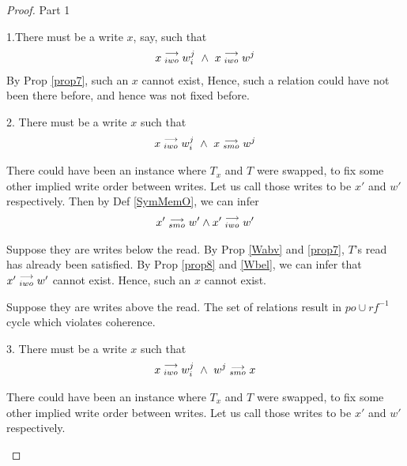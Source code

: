 \begin{proof}{Part 1}
\begin{itemize}
                        1.There must be a write $x$, say, such that 
                        \begin{align*}
                            \reln{x}{iwo}{w_i^j} \ \wedge \ \reln{x}{iwo}{w^j}
                        \end{align*}
                        By Prop \ref{prop7}, such an $x$ cannot exist, Hence, such a relation could have not been there before, and hence was not fixed before.

                        2. There must be a write $x$ such that 
                        \begin{align*}
                            \reln{x}{iwo}{w_i^j} \ \wedge \ \reln{x}{smo}{w^j}
                        \end{align*}

                        There could have been an instance where $T_x$ and $T$ were swapped, to fix some other implied write order between writes. 
                        Let us call those writes to be $x'$ and $w'$ respectively.
                        Then by Def \ref{SymMemO}, we can infer 
                        \begin{align*}
                            x'\stackrel{\longrightarrow}{_{smo}}w' \wedge x'\stackrel{\longrightarrow}{_{iwo}}w'
                        \end{align*}
                        
                        Suppose they are writes below the read.                         
                        By Prop \ref{Wabv} and \ref{prop7}, $T$'s read has already been satisfied. By Prop \ref{prop8} and \ref{Wbel}, we can infer that $x'\stackrel{\longrightarrow}{_{iwo}}w'$ cannot exist. Hence, such an $x$ cannot exist. 
                        
                        Suppose they are writes above the read.
                        The set of relations result in $po \cup rf^{-1}$ cycle which violates coherence.  

                        3. There must be a write $x$ such that 
                        \begin{align*}
                            \reln{x}{iwo}{w_i^j} \ \wedge \ \reln{w^j}{smo}{x}
                        \end{align*}

                        There could have been an instance where $T_x$ and $T$ were swapped, to fix some other implied write order between writes. 
                        Let us call those writes to be $x'$ and $w'$ respectively.
                        

\end{itemize}
\end{proof}

